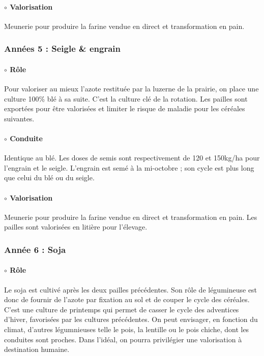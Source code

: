 \documentclass{book}
\begin{document}
\paragraph{$\circ$ Valorisation} Meunerie pour produire la farine vendue en direct et transformation en pain.

\subsubsection{Années 5 : Seigle \& engrain}

\paragraph{$\circ$ Rôle} Pour valoriser au mieux l'azote restituée par la luzerne de la prairie, on place une culture 100\% blé à sa suite. C'est la culture clé de la rotation. Les pailles sont exportées pour être valorisées et limiter le risque de maladie pour les céréales suivantes.

\paragraph{$\circ$ Conduite} Identique au blé. Les doses de semis sont respectivement de 120 et 150kg/ha pour l'engrain et le seigle. L'engrain est semé à la mi-octobre ; son cycle est plus long que celui du blé ou du seigle.

\paragraph{$\circ$ Valorisation} Meunerie pour produire la farine vendue en direct et transformation en pain. Les pailles sont valorisées en litière pour l'élevage. 

\subsubsection{Année 6 : Soja}

\paragraph{$\circ$ Rôle} Le soja est cultivé après les deux pailles précédentes. Son rôle de légumineuse est donc de fournir de l'azote par fixation au sol et de couper le cycle des céréales. C'est une culture de printemps qui permet de casser le cycle des adventices d'hiver, favorisées par les cultures précédentes. On peut envisager, en fonction du climat, d'autres légumnieuses telle le pois, la lentille ou le pois chiche, dont les conduites sont proches. Dans l'idéal, on pourra privilégier une valorisation à destination humaine.
\end{document}
